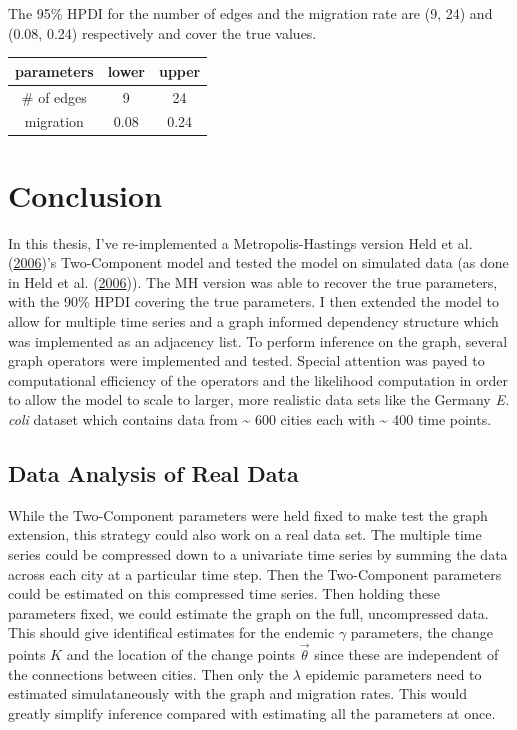 \documentclass[11pt,a4paper]{article}
\numberwithin{equation}{section}
\begin{document}
The 95\% HPDI for the number of edges and the migration rate are (9, 24)
and (0.08, 0.24) respectively and cover the true values.

\begin{longtable}[]{@{}ccc@{}}
\toprule
parameters & lower & upper\tabularnewline
\midrule
\endhead
\# of edges & 9 & 24\tabularnewline
migration & 0.08 & 0.24\tabularnewline
\bottomrule
\end{longtable}

\pagebreak

\hypertarget{conclusion}{%
\section{Conclusion}\label{conclusion}}

In this thesis, I've re-implemented a Metropolis-Hastings version Held
et al. (\protect\hyperlink{ref-held_two-component_2006}{2006})'s
Two-Component model and tested the model on simulated data (as done in
Held et al. (\protect\hyperlink{ref-held_two-component_2006}{2006})).
The MH version was able to recover the true parameters, with the 90\%
HPDI covering the true parameters. I then extended the model to allow
for multiple time series and a graph informed dependency structure which
was implemented as an adjacency list. To perform inference on the graph,
several graph operators were implemented and tested. Special attention
was payed to computational efficiency of the operators and the
likelihood computation in order to allow the model to scale to larger,
more realistic data sets like the Germany \emph{E. coli} dataset which
contains data from \textasciitilde{} 600 cities each with
\textasciitilde{} 400 time points.

\hypertarget{data-analysis-of-real-data}{%
\subsection{Data Analysis of Real
Data}\label{data-analysis-of-real-data}}

While the Two-Component parameters were held fixed to make test the
graph extension, this strategy could also work on a real data set. The
multiple time series could be compressed down to a univariate time
series by summing the data across each city at a particular time step.
Then the Two-Component parameters could be estimated on this compressed
time series. Then holding these parameters fixed, we could estimate the
graph on the full, uncompressed data. This should give identifical
estimates for the endemic \(\gamma\) parameters, the change points \(K\)
and the location of the change points \(\vec{\theta}\) since these are
independent of the connections between cities. Then only the \(\lambda\)
epidemic parameters need to estimated simulataneously with the graph and
migration rates. This would greatly simplify inference compared with
estimating all the parameters at once.
\end{document}

